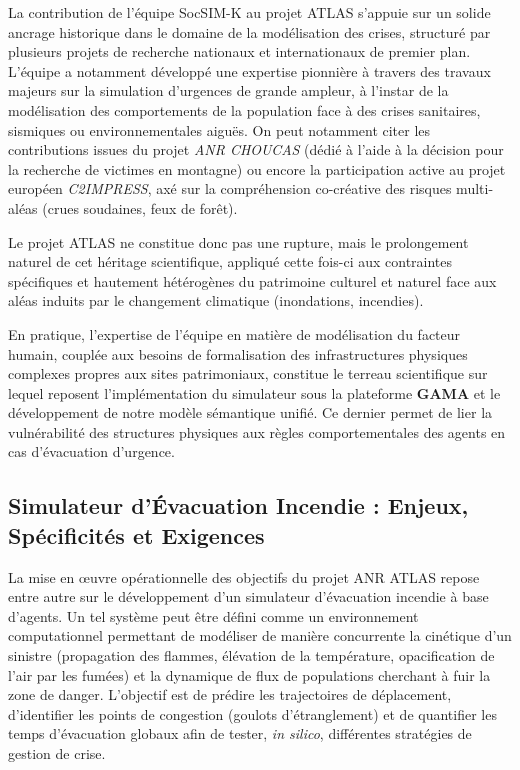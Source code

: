 \documentclass{article}
\begin{document}
La contribution de l'équipe SocSIM-K au projet ATLAS s'appuie sur un solide ancrage historique dans le domaine de la modélisation des crises, structuré par plusieurs projets de recherche nationaux et internationaux de premier plan. L'équipe a notamment développé une expertise pionnière à travers des travaux majeurs sur la simulation d'urgences de grande ampleur, à l'instar de la modélisation des comportements de la population face à des crises sanitaires, sismiques ou environnementales aiguës. On peut notamment citer les contributions issues du projet \textit{ANR CHOUCAS} (dédié à l'aide à la décision pour la recherche de victimes en montagne) ou encore la participation active au projet européen \textit{C2IMPRESS}, axé sur la compréhension co-créative des risques multi-aléas (crues soudaines, feux de forêt). 

Le projet ATLAS ne constitue donc pas une rupture, mais le prolongement naturel de cet héritage scientifique, appliqué cette fois-ci aux contraintes spécifiques et hautement hétérogènes du patrimoine culturel et naturel face aux aléas induits par le changement climatique (inondations, incendies). 

En pratique, l'expertise de l'équipe en matière de modélisation du facteur humain, couplée aux besoins de formalisation des infrastructures physiques complexes propres aux sites patrimoniaux, constitue le terreau scientifique sur lequel reposent l'implémentation du simulateur sous la plateforme \textbf{GAMA} et le développement de notre modèle sémantique unifié. Ce dernier permet de lier la vulnérabilité des structures physiques aux règles comportementales des agents en cas d'évacuation d'urgence.

\subsection{Simulateur d'Évacuation Incendie : Enjeux, Spécificités et Exigences}
\label{subsec:simulateur_evacuation_incendie}

La mise en œuvre opérationnelle des objectifs du projet ANR ATLAS repose entre autre sur le développement d'un simulateur d'évacuation incendie à base d'agents. Un tel système peut être défini comme un environnement computationnel permettant de modéliser de manière concurrente la cinétique d'un sinistre (propagation des flammes, élévation de la température, opacification de l'air par les fumées) et la dynamique de flux de populations cherchant à fuir la zone de danger. L'objectif est de prédire les trajectoires de déplacement, d'identifier les points de congestion (goulots d'étranglement) et de quantifier les temps d'évacuation globaux afin de tester, \textit{in silico}, différentes stratégies de gestion de crise.
\end{document}
